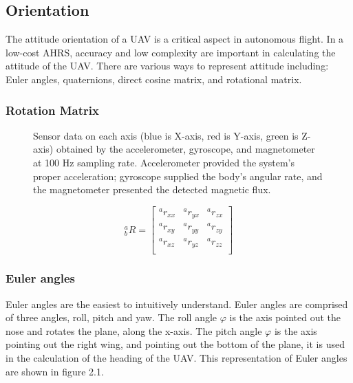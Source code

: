 \subsection{Orientation}

The attitude orientation of a UAV is a critical aspect in autonomous flight. In a low-cost
AHRS, accuracy and low complexity are important in calculating the attitude of the UAV.
There are various ways to represent attitude including: Euler angles, quaternions, direct
cosine matrix, and rotational matrix.

\subsubsection{Rotation Matrix}

\begin{figure}[!h]
    \centering
    \resizebox{0.49\linewidth}{!}{}
    \resizebox{0.49\linewidth}{!}{}
    \caption{Sensor data on each axis (blue is X-axis, red is Y-axis, green is Z-axis) obtained by the accelerometer, gyroscope, and magnetometer at 100 Hz sampling rate. Accelerometer provided the system’s proper acceleration; gyroscope supplied the body’s angular rate, and the magnetometer presented the detected magnetic flux.}
\end{figure}

\begin{equation}
    \textrm{$_{b}^{a}R$}
    =
    \begin{bmatrix}
        \textrm{$^{a}r_{xx}$} & \textrm{$^{a}r_{yx}$} & \textrm{$^{a}r_{zx}$} \\
        \textrm{$^{a}r_{xy}$} & \textrm{$^{a}r_{yy}$} & \textrm{$^{a}r_{zy}$} \\
        \textrm{$^{a}r_{xz}$} & \textrm{$^{a}r_{yz}$} & \textrm{$^{a}r_{zz}$} \\
    \end{bmatrix}
\end{equation}

\subsubsection{Euler angles}

Euler angles are the easiest to intuitively understand. Euler angles are comprised of three angles, roll, pitch and yaw. The roll angle $\varphi$  is the axis pointed out the nose and rotates the plane, along the x-axis. The pitch angle $\varphi$ is the axis pointing out the right wing, and
pointing out the bottom of the plane, it is used in the calculation of the heading of the UAV.
This representation of Euler angles are shown in figure 2.1.

